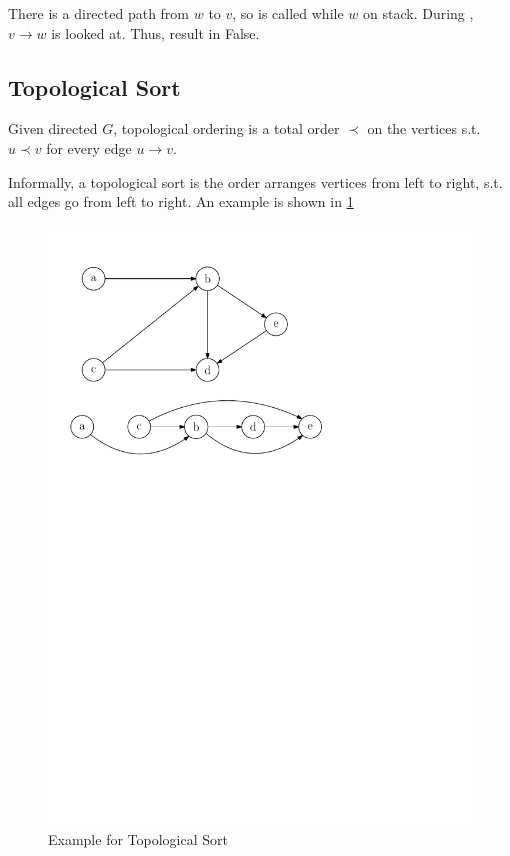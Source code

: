 There is a directed path from $w$ to $v$, so 
is called while $w$ on stack.
During , $v \rightarrow w$ is looked at.
Thus, result in False.


\subsection{Topological Sort}
Given directed $G$, topological ordering is a total order $\prec$
on the vertices s.t. $u \prec v$ for every edge $u \rightarrow v$.

Informally, a topological sort is the order arranges vertices from
left to right, s.t. all edges go from left to right.
An example is shown in \cref{fig:topoexample}
\begin{figure}[H]
    \caption{Example for Topological Sort}\label{fig:topoexample}
    \centering
    \includegraphics[scale=0.8]{fig/topo1.pdf}
\end{figure}

